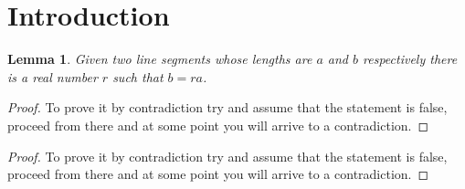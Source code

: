 \documentclass{article}
\newtheorem{lemma}[theorem]{Lemma}
\begin{document}
\section{Introduction}

\begin{lemma}
Given two line segments whose lengths are \(a\) and \(b\) respectively there 
is a real number \(r\) such that \(b=ra\).
\end{lemma}

\renewcommand\qedsymbol{$\blacksquare$}

\begin{proof}
To prove it by contradiction try and assume that the statement is false,
proceed from there and at some point you will arrive to a contradiction.
\end{proof}

\renewcommand\qedsymbol{QED}

\begin{proof}
To prove it by contradiction try and assume that the statement is false,
proceed from there and at some point you will arrive to a contradiction.
\end{proof}
\end{document}
